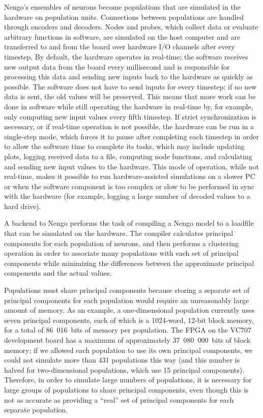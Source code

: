 \documentclass[english]{article}
\begin{document}
Nengo's ensembles of neurons become populations that are simulated in the hardware on population units.
Connections between populations are handled through encoders and decoders.
Nodes and probes, which collect data or evaluate arbitrary functions in software, are
simulated on the host computer and are transferred to and from the board over hardware 
I/O channels after every timestep. 
By default, the hardware operates in real-time; the software receives new output data from the board
every millisecond and is responsible for processing this data and sending new inputs back to the hardware as quickly as possible.
The software does not have to send inputs for every timestep; if no new data is sent, the old values will be preserved.
This means that more work can be done in software while still operating the hardware in real-time by, for example,
only computing new input values every fifth timestep.
If strict synchronization is necessary, or if real-time operation is not possible,
the hardware can be run in a single-step mode, which forces it to pause after completing each timestep in order
to allow the software time to complete its tasks, which may include updating plots, logging received data to a file,
computing node functions, and calculating and sending new input values to the hardware.
This mode of operation, while not real-time, makes it possible to run hardware-assisted simulations
on a slower PC or when the software component is too complex or slow to be performed in sync with the hardware
(for example, logging a large number of decoded values to a hard drive).

A backend to Nengo performs the task of compiling a Nengo model to a loadfile that can be
simulated on the hardware. The compiler calculates principal components for each population
of neurons, and then performs a clustering operation in order to associate many
populations with each set of principal components while minimizing the differences
between the approximate principal components and the actual values. 

Populations must share principal components because storing a separate set of principal components for each population would require
an unreasonably large amount of memory. As an example, a one-dimensional population currently uses seven principal components,
each of which is a 1024-word, 12-bit block memory, for a total of 86~016~bits of memory per population.
The FPGA on the VC707 development board has a maximum of approximately 37~080~000~bits of block memory;
if we allowed each population to use its own principal components, we could not simulate more than 431 populations this way
(and this number is halved for two-dimensional populations, which use 15 principal components).
Therefore, in order to simulate large numbers of populations, it is necessary for large groups of populations to share principal components,
even though this is not as accurate as providing a ``real'' set of principal components for each separate population.
\end{document}
